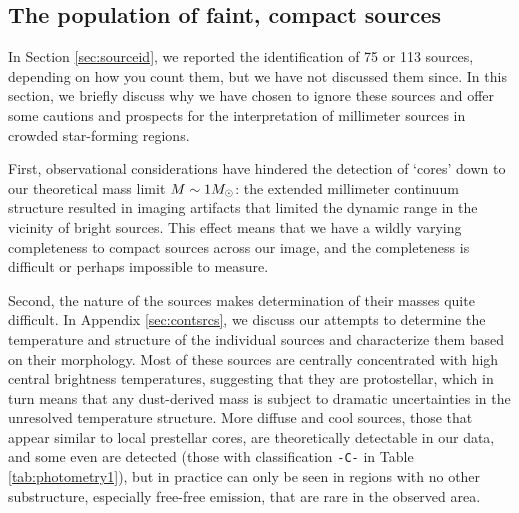 \documentclass{emulateapj}
\begin{document}

\subsection{The population of faint, compact sources}
\label{sec:faintsrcs_discussion}
In Section \ref{sec:sourceid}, we reported the identification of 75 or 113
sources, depending on how you count them, but we have not discussed them since.
In this section, we briefly discuss why we have chosen to ignore these sources
and offer some cautions and prospects for the interpretation of millimeter sources
in crowded star-forming regions. 

First, observational considerations have hindered the detection of `cores' down
to our theoretical mass limit $M\sim1M_{\odot}$: the  extended millimeter continuum
structure resulted in imaging artifacts that limited the dynamic range in the
vicinity of bright sources.  This effect means that we have a wildly varying
completeness to compact sources across our image, and the completeness is
difficult or perhaps impossible to measure.

Second, the nature of the sources makes determination of their masses quite
difficult.  In Appendix \ref{sec:contsrcs}, we discuss our attempts to
determine the temperature and structure of the individual sources and
characterize them based on their morphology.  Most of these sources are
centrally concentrated with high central brightness temperatures, suggesting
that they are protostellar, which in turn means that any dust-derived mass is
subject to dramatic uncertainties in the unresolved temperature structure.
More diffuse and cool sources, those that appear similar to local prestellar
cores, are theoretically detectable in our data, and some even are detected
(those with classification \texttt{-C-} in Table \ref{tab:photometry1}), but in
practice can only be seen in regions with no other substructure, especially
free-free emission, that are rare in the observed area.
\end{document}

